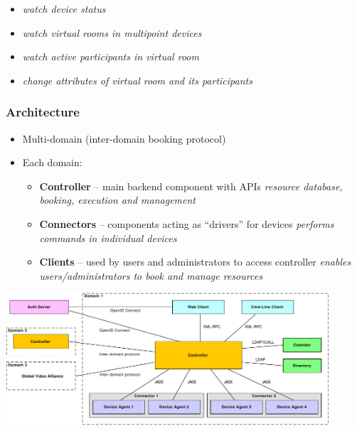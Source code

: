 \documentclass{beamer}
\begin{document}
\begin{frame}
\begin{itemize}
\begin{itemize}
      \begin{itemize}    
        \item \textit{watch device status}
        \item \textit{watch virtual rooms in multipoint devices}
        \item \textit{watch active participants in virtual room}
        \item \textit{change attributes of virtual room and its participants}
      \end{itemize}\vspace*{1mm}
    \end{itemize}
  \end{itemize}          
\end{frame}

\begin{frame}
  \frametitle{Architecture}
  \begin{itemize}
    \item Multi-domain (inter-domain booking protocol)
    \item Each domain:
    \begin{itemize}
      \item \textbf{Controller} -- main backend component with APIs
      \newline\textit{resource database, booking, execution and management}
      \item \textbf{Connectors} -- components acting as “drivers” for devices
      \newline\textit{performs commands in individual devices}
      \item \textbf{Clients} -- used by users and administrators to access controller
      \newline\textit{enables users/administrators to book and manage resources}
    \end{itemize}
  \end{itemize}
  \begin{center}
  \includegraphics[width=0.9\textwidth]{../architecture/diagrams/dd_architecture.pdf}
  \end{center}
\end{frame}
\end{document}
